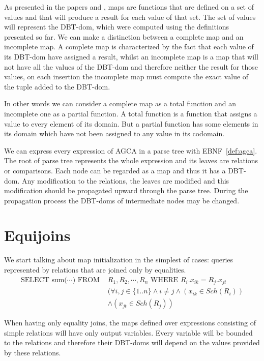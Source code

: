 \documentclass[12pt]{article}
\newcommand{\dom}{\textsf{DBT-dom}}
\begin{document}
As presented in the papers \cite{1} and \cite{2}, maps are functions that are defined on a set of values and that will produce a result for each value of that set. The set of values will represent the \dom{}, which were computed using the definitions presented so far. We can make a distinction between a complete map and an incomplete map. A complete map is characterized by the fact that each value of its \dom{} have assigned a result, whilst an incomplete map is a map that will not have all the values of the \dom{} and therefore neither the result for those values, on each insertion the incomplete map must compute the exact value of the tuple added to the \dom{}.

In other words we can consider a complete map as a total function and an incomplete one as a partial function. A total function is a function that assigns a value to every element of its domain. But a partial function has some elements in its domain which have not been assigned to any value in its codomain. \par

We can express every expression of AGCA in a parse tree with EBNF~\ref{def:agca}. The root of parse tree represents the whole expression and its leaves are relations or comparisons. Each node can be regarded as a map and thus it has a \dom{}. Any modification to the relations, the leaves are modified and this modification should be propagated upward through the parse tree. During the propagation process the \dom{}s of intermediate nodes may be changed. 

\section{Equijoins}

We start talking about map initialization in the simplest of cases: queries represented by relations that are joined only by equalities.
\begin{align}
\mbox{SELECT sum(}\cdots\mbox{) FROM }&R_1,R_2,\cdots,R_n\mbox{ WHERE }R_i.x_{ik}=R_j.x_{jt} \label{query1}\\
&(\forall i,j\in\{1..n\}\land i\not=j\land (x_{ik}\in Sch(R_i))\nonumber\\
&\land(x_{jt}\in Sch(R_j))\nonumber
\end{align}

When having only equality joins, the maps defined over expressions consisting of simple relations will have only output variables. Every variable will be bounded to the relations and therefore their \dom{}s will depend on the values provided by these relations.
\end{document}
